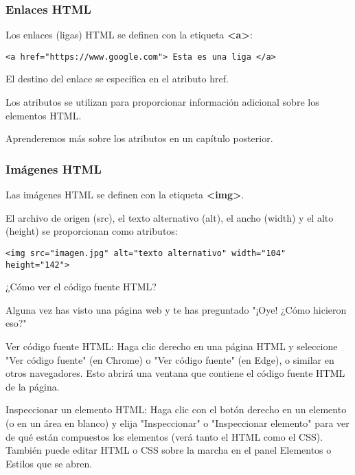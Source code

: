 \begin{frame}[fragile]
  \frametitle{Enlaces HTML}

  Los enlaces (ligas) HTML se definen con la etiqueta \textbf{<a>}:

  \vspace{\baselineskip}
  \begin{lstlisting}
<a href="https://www.google.com"> Esta es una liga </a>
  \end{lstlisting}

  \vspace{\baselineskip}
  El destino del enlace se especifica en el atributo
  \textcolor{editorGreen}{href}.

  \vspace{\baselineskip}
  Los atributos se utilizan para proporcionar información
  adicional sobre los elementos HTML.

  \vspace{\baselineskip}
  Aprenderemos más sobre los atributos en un capítulo posterior.
\end{frame}

\begin{frame}[fragile]
  \frametitle{Imágenes HTML}

  Las imágenes HTML se definen con la etiqueta \textbf{<img>}.

  El archivo de origen (\textcolor{editorGreen}{src}), el texto
  alternativo (\textcolor{editorGreen}{alt}), el ancho
  (\textcolor{editorGreen}{width}) y el alto
  (\textcolor{editorGreen}{height}) se proporcionan como atributos:

  \vspace{\baselineskip}
  \begin{lstlisting}
<img src="imagen.jpg" alt="texto alternativo" width="104" height="142">
  \end{lstlisting}
\end{frame}

\begin{frame}[c]{¿Cómo ver el código fuente HTML?}

  Alguna vez has visto una página web y te has preguntado
  "¡Oye! ¿Cómo hicieron eso?"

  \begin{block}{Ver código fuente HTML:}
    Haga clic derecho en una página HTML y seleccione "Ver código fuente"
    (en Chrome) o "Ver código fuente" (en Edge), o similar en otros
    navegadores. Esto abrirá una ventana que contiene el código fuente
    HTML de la página.
  \end{block}

  \begin{exampleblock}{Inspeccionar un elemento HTML:}
    Haga clic con el botón derecho en un elemento (o en un área en blanco)
    y elija "Inspeccionar" o "Inspeccionar elemento" para ver de qué están
    compuestos los elementos (verá tanto el HTML como el CSS). También
    puede editar HTML o CSS sobre la marcha en el panel Elementos o
    Estilos que se abren.
  \end{exampleblock}
\end{frame}

